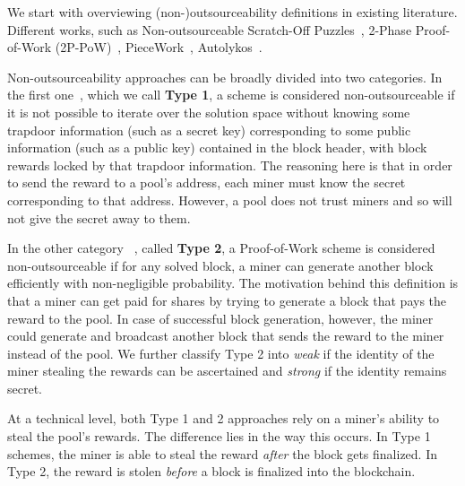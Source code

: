 \documentclass[11pt]{article}
\begin{document}
We start with overviewing (non-)outsourceability definitions in existing literature. Different works, such as
Non-outsourceable Scratch-Off Puzzles~\cite{miller2015nonoutsourceable}, 2-Phase Proof-of-Work (2P-PoW)~\cite{twophase},
PieceWork~\cite{daian2017short}, Autolykos~\cite{autolykos}.


Non-outsourceability approaches can be broadly divided into two categories. In the first one~\cite{autolykos, daian2017short, twophase}, which we call \textbf{Type 1}, a scheme is considered
non-outsourceable if it is not possible to iterate over the solution space without knowing some trapdoor information (such as a secret key) corresponding to some public information (such as a public key) contained in the block header, with block rewards locked by that trapdoor information. The reasoning here is that in order to send the reward to a pool's address, each miner must know the secret corresponding to that address. However, a pool does not trust miners and so will not give the secret away to them. 

In the other category
~\cite{miller2015nonoutsourceable}, called \textbf{Type 2}, a Proof-of-Work scheme is considered non-outsourceable if for any solved block, a miner can generate another block efficiently with non-negligible probability. The motivation behind this definition is that a miner can get paid for shares
by trying to generate a block that pays the reward to the pool. In case of successful block generation, however, the miner could generate and broadcast another block that sends the reward to the miner instead of the pool. 
We further classify Type 2 into {\em weak} if the identity of the miner stealing the rewards can be ascertained and {\em strong} if the identity remains secret.

At a technical level, both Type 1 and 2 approaches rely on a miner's ability to steal the pool's rewards. The difference lies in the way this occurs. In Type 1 schemes, the miner is able to steal the reward {\em after} the block gets finalized.
In Type 2, 
the reward is stolen {\em before} a block is finalized into the blockchain. 
\end{document}
